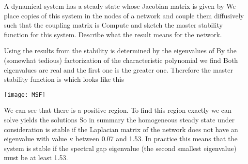 

A dynamical system has a steady state whose Jacobian matrix is given by
We place copies of this system in the nodes of a network and couple them diffusively such that the coupling matrix is 
Compute and sketch the master stability function for this system. Describe what the result means for the network. 

\solution

Using the results from the stability is determined by the eigenvalues of 
By the (somewhat tedious) factorization of the characteristic polynomial we find 
Both eigenvalues are real and the first one is the greater one. Therefore the master stability function is 
which looks like this
\begin{center}
\texttt{[image: MSF]}
\end{center}
We can see that there is a positive region. To find this region exactly 
we can solve 
yields the solutions
So in summary the homogeneous steady state under consideration is stable if the Laplacian matrix of the network does not have an eigenvalue with value $\kappa$ between 0.07 and 1.53. In practice this means that the system is stable if the spectral gap eigenvalue (the second smallest eigenvalue) must be at least 1.53.  
